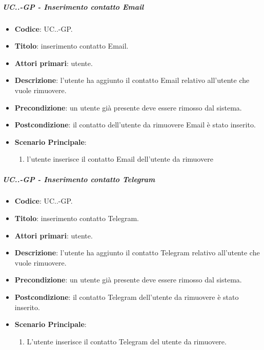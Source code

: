 			\subparagraph{UC\theuccount.\thesubuccount.\thesubsubuccount-GP - Inserimento contatto Email}
				
				\begin{itemize}
					\item \textbf{Codice}: UC\theuccount.\thesubuccount.\thesubsubuccount-GP.
					\item \textbf{Titolo}: inserimento contatto Email.
					\item \textbf{Attori primari}: utente.
					\item \textbf{Descrizione}: l'utente ha aggiunto il contatto Email relativo all'utente che vuole rimuovere.
					\item \textbf{Precondizione}: un utente già presente deve essere rimosso dal sistema.
					\item \textbf{Postcondizione}: il contatto dell'utente da rimuovere Email è stato inserito.
					\item \textbf{Scenario Principale}:
					\begin{enumerate}
						\item l'utente inserisce il contatto Email dell'utente da rimuovere
					\end{enumerate}
				\end{itemize}
			
			\subparagraph{UC\theuccount.\thesubuccount.\thesubsubuccount-GP - Inserimento contatto Telegram}
				
				\begin{itemize}
					\item \textbf{Codice}: UC\theuccount.\thesubuccount.\thesubsubuccount-GP.
					\item \textbf{Titolo}: inserimento contatto Telegram.
					\item \textbf{Attori primari}: utente.
					\item \textbf{Descrizione}: l'utente ha aggiunto il contatto Telegram relativo all'utente che vuole \newline rimuovere.
					\item \textbf{Precondizione}: un utente già presente deve essere rimosso dal sistema.
					\item \textbf{Postcondizione}: il contatto Telegram dell'utente da rimuovere è stato inserito.
					\item \textbf{Scenario Principale}:
					\begin{enumerate}
						\item L'utente inserisce il contatto Telegram del utente da rimuovere.
					\end{enumerate}
				\end{itemize}
			
